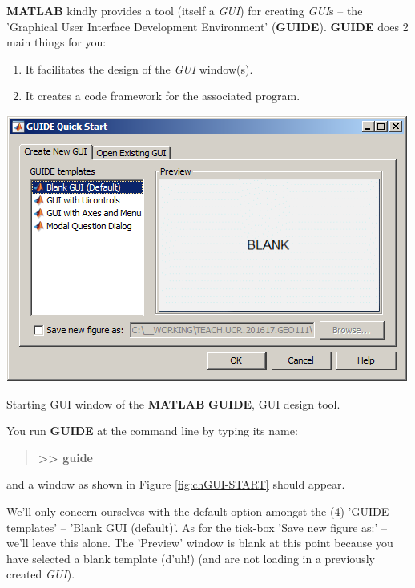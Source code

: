 \documentclass{tufte-book} %
\newenvironment{docspecbold}{\begin{quotation}\ttfamily\bfseries\parskip0pt\parindent0pt\ignorespaces}{\end{quotation}}
\begin{document}
\textbf{MATLAB} kindly provides a tool (itself a \textit{GUI}) for creating \textit{GUI}s -- the 'Graphical User Interface Development Environment' (\textbf{GUIDE}). \textbf{GUIDE} does 2 main things for you:
\begin{enumerate}[noitemsep]
\setlength{\itemindent}{.2in}
\item It facilitates the design of the \textit{GUI} window(s).
\item It creates a code framework for the associated program.
\end{enumerate}

\begin{marginfigure}[0.0in]
\includegraphics[width=\linewidth]{chGUI-START.png}
\caption{Starting GUI window of the \textbf{MATLAB} \textbf{GUIDE}, GUI design tool.}
\label{fig:chGUI-START}
\end{marginfigure}

You run \textbf{GUIDE} at the command line by typing its name:
\vspace{-1mm}\begin{docspecbold}
>> guide
\end{docspecbold}\vspace{-1mm}
and a window as shown in Figure \ref{fig:chGUI-START} should appear. 

We'll only concern ourselves with the default option amongst the (4) '\textsf{GUIDE templates}' -- '\textsf{Blank GUI (default)}'. As for the tick-box '\textsf{Save new figure as:}' -- we'll leave this alone. The '\textsf{Preview}' window is blank at this point because you have selected a blank template (d'uh!) (and are not loading in a previously created \textit{GUI}). 
\end{document}
